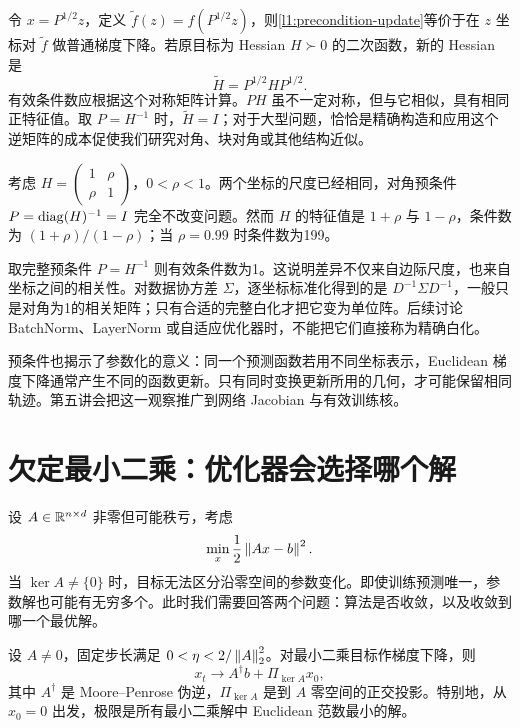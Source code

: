 令 $x=P^{1/2}z$，定义 $\widetilde f(z)=f(P^{1/2}z)$，则\eqref{l1:precondition-update}等价于在 $z$ 坐标对 $\widetilde f$ 做普通梯度下降。若原目标为 Hessian $H\succ0$ 的二次函数，新的 Hessian 是
\begin{equation}
 \widetilde H=P^{1/2}HP^{1/2}.
 \label{l1:precondition-hessian}
\end{equation}
有效条件数应根据这个对称矩阵计算。$PH$ 虽不一定对称，但与它相似，具有相同正特征值。取 $P=H^{-1}$ 时，$\widetilde H=I$；对于大型问题，恰恰是精确构造和应用这个逆矩阵的成本促使我们研究对角、块对角或其他结构近似。

\begin{example}[标准化不等于白化]
\label{l1:ex-whitening}
考虑 $H=\begin{pmatrix}1&\rho\\\rho&1\end{pmatrix}$，$0<\rho<1$。两个坐标的尺度已经相同，对角预条件 $P=\operatorname{diag}(H)^{-1}=I$ 完全不改变问题。然而 $H$ 的特征值是 $1+\rho$ 与 $1-\rho$，条件数为 $(1+\rho)/(1-\rho)$；当 $\rho=0.99$ 时条件数为199。

取完整预条件 $P=H^{-1}$ 则有效条件数为1。这说明差异不仅来自边际尺度，也来自坐标之间的相关性。对数据协方差 $\Sigma$，逐坐标标准化得到的是 $D^{-1}\Sigma D^{-1}$，一般只是对角为1的相关矩阵；只有合适的完整白化才把它变为单位阵。后续讨论 BatchNorm、LayerNorm 或自适应优化器时，不能把它们直接称为精确白化。
\end{example}

预条件也揭示了参数化的意义：同一个预测函数若用不同坐标表示，Euclidean 梯度下降通常产生不同的函数更新。只有同时变换更新所用的几何，才可能保留相同轨迹。第五讲会把这一观察推广到网络 Jacobian 与有效训练核。

\section{欠定最小二乘：优化器会选择哪个解}
\label{l1:min-norm}

设 $A\in\mathbb R^{n\times d}$ 非零但可能秩亏，考虑
\[
 \min_x\frac12\left\lVert Ax-b\right\rVert^2.
\]
当 $\ker A\ne\{0\}$ 时，目标无法区分沿零空间的参数变化。即使训练预测唯一，参数解也可能有无穷多个。此时我们需要回答两个问题：算法是否收敛，以及收敛到哪一个最优解。

\begin{theorem}[梯度下降的最小范数选择]
\label{l1:thm-min-norm}
设 $A\ne0$，固定步长满足 $0<\eta<2/\left\lVert A\right\rVert_2^2$。对最小二乘目标作梯度下降，则
\begin{equation}
 x_t\longrightarrow A^\dagger b+\Pi_{\ker A}x_0,
 \label{l1:min-norm-limit}
\end{equation}
其中 $A^\dagger$ 是 Moore--Penrose 伪逆，$\Pi_{\ker A}$ 是到 $A$ 零空间的正交投影。特别地，从 $x_0=0$ 出发，极限是所有最小二乘解中 Euclidean 范数最小的解。
\end{theorem}

